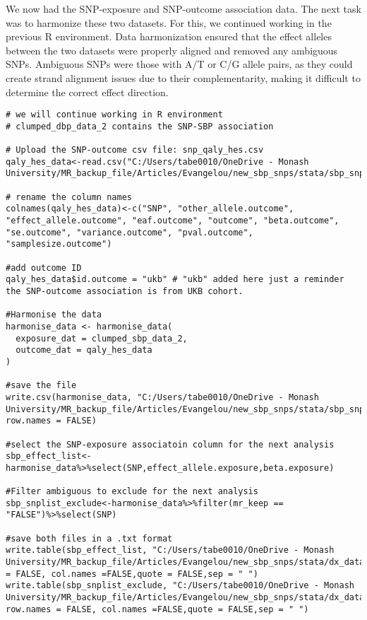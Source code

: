 \documentclass[11pt]{article}
\begin{document}
We now had the SNP-exposure and SNP-outcome association data. The next task was to harmonize these two datasets. For this, we continued working in the previous R environment. Data harmonization ensured that the effect alleles between the two datasets were properly aligned and removed any ambiguous SNPs. Ambiguous SNPs were those with A/T or C/G allele pairs, as they could create strand alignment issues due to their complementarity, making it difficult to determine the correct effect direction.
\begin{lstlisting}[style=Rstyle]
# we will continue working in R environment
# clumped_dbp_data_2 contains the SNP-SBP association 

# Upload the SNP-outcome csv file: snp_qaly_hes.csv
qaly_hes_data<-read.csv("C:/Users/tabe0010/OneDrive - Monash University/MR_backup_file/Articles/Evangelou/new_sbp_snps/stata/sbp_snps/snp_qaly_hes.csv")

# rename the column names
colnames(qaly_hes_data)<-c("SNP", "other_allele.outcome", "effect_allele.outcome", "eaf.outcome", "outcome", "beta.outcome", "se.outcome", "variance.outcome", "pval.outcome", "samplesize.outcome")

#add outcome ID
qaly_hes_data$id.outcome = "ukb" # "ukb" added here just a reminder the SNP-outcome association is from UKB cohort. 

#Harmonise the data 
harmonise_data <- harmonise_data(
  exposure_dat = clumped_sbp_data_2, 
  outcome_dat = qaly_hes_data
)

#save the file 
write.csv(harmonise_data, "C:/Users/tabe0010/OneDrive - Monash University/MR_backup_file/Articles/Evangelou/new_sbp_snps/stata/sbp_snps/snp_sbp_qaly_hes_harmonised.csv", row.names = FALSE)

#select the SNP-exposure associatoin column for the next analysis 
sbp_effect_list<-harmonise_data%>%select(SNP,effect_allele.exposure,beta.exposure)

#Filter ambiguous to exclude for the next analysis 
sbp_snplist_exclude<-harmonise_data%>%filter(mr_keep == "FALSE")%>%select(SNP)

#save both files in a .txt format 
write.table(sbp_effect_list, "C:/Users/tabe0010/OneDrive - Monash University/MR_backup_file/Articles/Evangelou/new_sbp_snps/stata/dx_data/sbp/data/sbp_effect_list.txt",row.names = FALSE, col.names =FALSE,quote = FALSE,sep = " ")
write.table(sbp_snplist_exclude, "C:/Users/tabe0010/OneDrive - Monash University/MR_backup_file/Articles/Evangelou/new_sbp_snps/stata/dx_data/sbp/data/sbp_snplist_exclude.txt", row.names = FALSE, col.names =FALSE,quote = FALSE,sep = " ")

\end{lstlisting}
\color{black}
\end{document}
